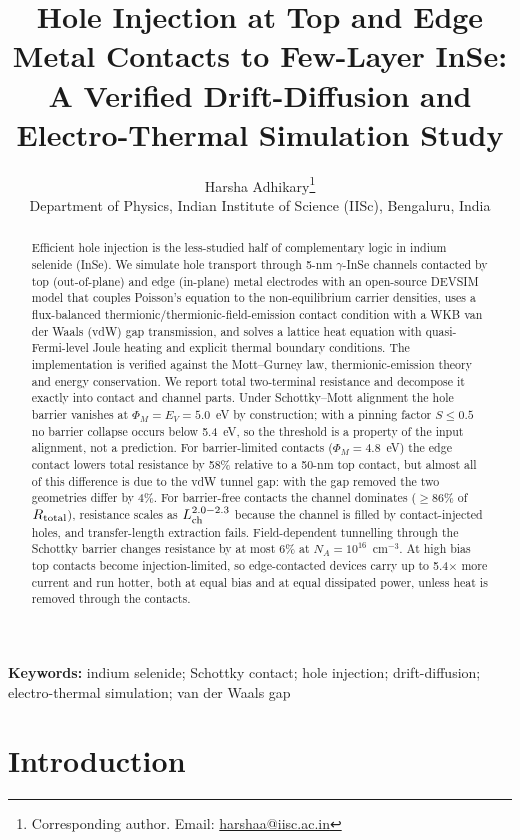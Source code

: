 \documentclass[11pt]{article}
\title{Hole Injection at Top and Edge Metal Contacts to Few-Layer InSe:\\ A Verified Drift-Diffusion and Electro-Thermal Simulation Study}
\author{Harsha Adhikary\thanks{Corresponding author. Email: \href{mailto:harshaa@iisc.ac.in}{harshaa@iisc.ac.in}} \\[4pt]
\small Department of Physics, Indian Institute of Science (IISc), Bengaluru, India}
\date{}
\begin{document}
\maketitle

\begin{abstract}
\noindent
Efficient hole injection is the less-studied half of complementary logic in indium selenide (InSe). We simulate hole transport through 5-nm $\gamma$-InSe channels contacted by top (out-of-plane) and edge (in-plane) metal electrodes with an open-source DEVSIM model that couples Poisson's equation to the non-equilibrium carrier densities, uses a flux-balanced thermionic/thermionic-field-emission contact condition with a WKB van der Waals (vdW) gap transmission, and solves a lattice heat equation with quasi-Fermi-level Joule heating and explicit thermal boundary conditions. The implementation is verified against the Mott--Gurney law, thermionic-emission theory and energy conservation. We report total two-terminal resistance and decompose it exactly into contact and channel parts. Under Schottky--Mott alignment the hole barrier vanishes at $\Phi_M=E_V=5.0$~eV by construction; with a pinning factor $S\le0.5$ no barrier collapse occurs below 5.4~eV, so the threshold is a property of the input alignment, not a prediction. For barrier-limited contacts ($\Phi_M=4.8$~eV) the edge contact lowers total resistance by 58\% relative to a 50-nm top contact, but almost all of this difference is due to the vdW tunnel gap: with the gap removed the two geometries differ by 4\%. For barrier-free contacts the channel dominates ($\geq$86\% of $R_{\rm total}$), resistance scales as $L_{\rm ch}^{2.0-2.3}$ because the channel is filled by contact-injected holes, and transfer-length extraction fails. Field-dependent tunnelling through the Schottky barrier changes resistance by at most 6\% at $N_A=10^{16}$~cm$^{-3}$. At high bias top contacts become injection-limited, so edge-contacted devices carry up to 5.4$\times$ more current and run hotter, both at equal bias and at equal dissipated power, unless heat is removed through the contacts.
\end{abstract}

\noindent\textbf{Keywords:} indium selenide; Schottky contact; hole injection; drift-diffusion; electro-thermal simulation; van der Waals gap

\linenumbers

\section{Introduction}
\label{sec:intro}
\end{document}
